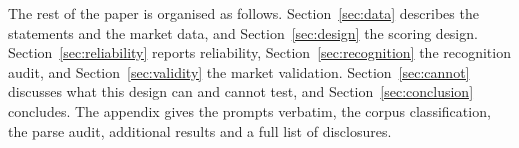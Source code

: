 \documentclass[11pt]{article}
\begin{document}
The rest of the paper is organised as follows. Section~\ref{sec:data} describes the statements and the
market data, and Section~\ref{sec:design} the scoring design. Section~\ref{sec:reliability} reports
reliability, Section~\ref{sec:recognition} the recognition audit, and Section~\ref{sec:validity} the
market validation. Section~\ref{sec:cannot} discusses what this design can and cannot test, and
Section~\ref{sec:conclusion} concludes. The appendix gives the prompts verbatim, the corpus
classification, the parse audit, additional results and a full list of disclosures.












\end{document}
